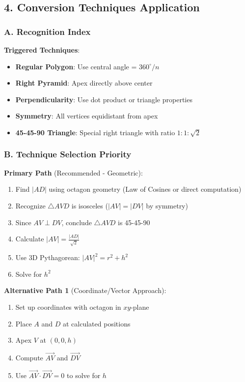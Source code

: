 \documentclass[12pt]{article}
\begin{document}
\begin{techniquesbox}
\subsection*{4. Conversion Techniques Application}

\subsubsection*{A. Recognition Index}

\textbf{Triggered Techniques}:
\begin{itemize}
    \item \textbf{Regular Polygon}: Use central angle = $360^\circ/n$
    \item \textbf{Right Pyramid}: Apex directly above center
    \item \textbf{Perpendicularity}: Use dot product or triangle properties
    \item \textbf{Symmetry}: All vertices equidistant from apex
    \item \textbf{45-45-90 Triangle}: Special right triangle with ratio $1:1:\sqrt{2}$
\end{itemize}

\subsubsection*{B. Technique Selection Priority}

\textbf{Primary Path} (Recommended - Geometric):
\begin{enumerate}
    \item Find $|AD|$ using octagon geometry (Law of Cosines or direct computation)
    \item Recognize $\triangle AVD$ is isosceles ($|AV| = |DV|$ by symmetry)
    \item Since $AV \perp DV$, conclude $\triangle AVD$ is 45-45-90
    \item Calculate $|AV| = \frac{|AD|}{\sqrt{2}}$
    \item Use 3D Pythagorean: $|AV|^2 = r^2 + h^2$
    \item Solve for $h^2$
\end{enumerate}

\textbf{Alternative Path 1} (Coordinate/Vector Approach):
\begin{enumerate}
    \item Set up coordinates with octagon in $xy$-plane
    \item Place $A$ and $D$ at calculated positions
    \item Apex $V$ at $(0, 0, h)$
    \item Compute $\vec{AV}$ and $\vec{DV}$
    \item Use $\vec{AV} \cdot \vec{DV} = 0$ to solve for $h$
\end{enumerate}


\end{techniquesbox}
\end{document}
